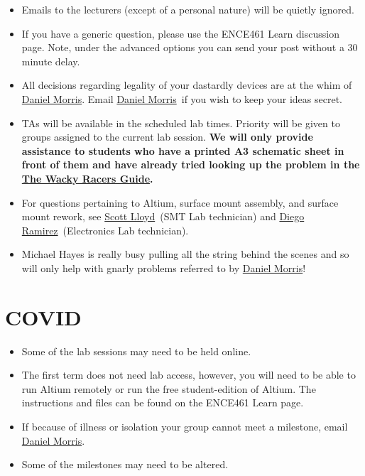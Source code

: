 \documentclass[11pt, a4paper]{article}
\makeatletter
\newcommand{\daniel}{\href{mailto:daniel.morris@pg.canterbury.ac.nz}{Daniel Morris}}
\newcommand{\scott}{\href{mailto:scott.lloyd@.canterbury.ac.nz}{Scott Lloyd}}
\newcommand{\diego}{\href{mailto:diego.ramirez@canterbury.ac.nz}{Diego Ramirez}}
\newcommand{\theguide}{\href{https://eng-git.canterbury.ac.nz/wacky-racers/wacky-racers/-/blob/master/doc/guide/guide.pdf}{The Wacky Racers Guide}}
\makeatother
\begin{document}
\begin{itemize}
\item Emails to the lecturers (except of a personal nature) will be
  quietly ignored.

\item If you have a generic question, please use the ENCE461 Learn
  discussion page.  Note, under the advanced options you can send your
  post without a 30\,minute delay.

\item All decisions regarding legality of your dastardly devices are
  at the whim of \daniel.  Email \daniel\ if you wish to keep your
  ideas secret.

\item TAs will be available in the scheduled lab times.  Priority will
  be given to groups assigned to the current lab session. \textbf{We
    will only provide assistance to students who have a printed A3
    schematic sheet in front of them and have already tried looking up
    the problem in the \theguide.}

\item For questions pertaining to Altium, surface mount assembly, and
  surface mount rework, see \scott\ (SMT Lab technician) and
  \diego\ (Electronics Lab technician).

\item Michael Hayes is really busy pulling all the string behind the
  scenes and so will only help with gnarly problems referred to by
  \daniel!

\end{itemize}


\section{COVID}


\begin{itemize}
\item Some of the lab sessions may need to be held online.

\item The first term does not need lab access, however, you will need
  to be able to run Altium remotely or run the free student-edition of
  Altium.  The instructions and files can be found on the ENCE461
  Learn page.

\item If because of illness or isolation your group cannot meet a
  milestone, email \daniel.

\item Some of the milestones may need to be altered.

\end{itemize}
\end{document}

